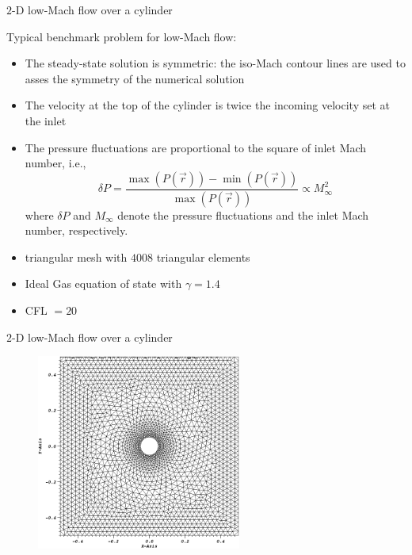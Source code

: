 \documentclass[xcolor=dvipsnames,10pt]{beamer}
\begin{document}
\begin{frame}{$2$-D low-Mach flow over a cylinder}
\begin{block}{Typical benchmark problem for low-Mach flow:}
\begin{itemize}
\item The steady-state solution is symmetric: the iso-Mach contour lines are used to asses the symmetry of the numerical solution
\item The velocity at the top of the cylinder is twice the incoming velocity set at the inlet
\item The pressure fluctuations are proportional to the square of inlet Mach number, i.e., 
\begin{equation}
\delta P = \frac{\max(P(\vec{r})) - \min(P(\vec{r}))}{\max(P(\vec{r}))}  \propto M_\infty^2 \nonumber
\end{equation}
where $\delta P$ and $M_\infty$ denote the pressure fluctuations and the inlet Mach number, respectively.
\end{itemize}
\end{block}
\begin{block}{}
\begin{itemize}
\item triangular mesh with $4008$ triangular elements
\item Ideal Gas equation of state with $\gamma = 1.4$
\item CFL $= 20$
\end{itemize}
\end{block}
\end{frame}
\begin{frame}{$2$-D low-Mach flow over a cylinder}
\begin{figure}[H]
\centering
\includegraphics[width=0.6\textwidth]{../figures/Cylinder_geometry.png}
\end{figure}
\end{frame}
\end{document}
